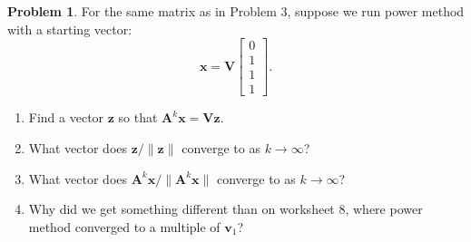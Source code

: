 \documentclass[12pt]{article}
\theoremstyle{definition}
\newtheorem{problem}{Problem}
\renewcommand{\vec}{\mathbf}
\begin{document}
\begin{problem}
For the same matrix as in Problem 3, suppose we run power method with a starting vector:
\[
\vec{x} = \vec{V}\begin{bmatrix}0\\1\\1\\1\end{bmatrix}.
\]

    \begin{enumerate}
        \item Find a vector $\vec{z}$ so that $\vec{A}^k \vec{x} = \vec{V} \vec{z}$.
        
        \item What vector does $\vec{z} / \|\vec{z}\|$ converge to as $k\to\infty$?

        \item What vector does $\vec{A}^k\vec{x} / \|\vec{A}^k\vec{x}\|$ converge to as $k\to\infty$?

        \item Why did we get something different than on worksheet 8, where power method converged to a multiple of $\vec{v}_1$?
    
    \end{enumerate}
\end{problem}
\end{document}
